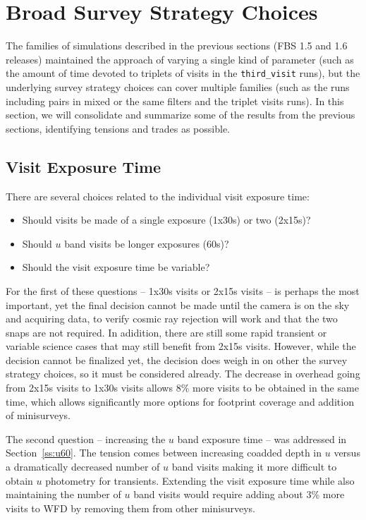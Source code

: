\section{Broad Survey Strategy Choices}

The families of simulations described in the previous sections (FBS 1.5 and 1.6 releases) maintained the approach of varying a single kind of parameter (such as the amount of time devoted to triplets of visits in the {\tt third\_visit} runs), but the underlying survey strategy choices can cover multiple families (such as the runs including pairs in mixed or the same filters and the triplet visits runs). In this section, we will consolidate and summarize some of the results from the previous sections, identifying tensions and trades as possible. 

\subsection{Visit Exposure Time}\label{sec:visitexposuretime}

There are several choices related to the individual visit exposure time:
 \begin{itemize}
 \item Should visits be made of a single exposure (1x30s) or two (2x15s)? 
 \item Should $u$ band visits be longer exposures (60s)?
 \item Should the visit exposure time be variable?
 \end{itemize}
 
For the first of these questions -- 1x30s visits or 2x15s visits -- is perhaps the most important, yet the final decision cannot be made until the camera is on the sky and acquiring data, to verify cosmic ray rejection will work and that the two snaps are not required. In adidition, there are still some rapid transient or variable science cases that may still benefit from 2x15s visits. However, while the decision cannot be finalized yet, the decision does weigh in on other the survey strategy choices, so it must be considered already. The decrease in overhead going from 2x15s visits to 1x30s visits allows 8\% more visits to be obtained in the same time, which allows significantly more options for footprint coverage and addition of minisurveys. 

The second question -- increasing the $u$ band exposure time -- was addressed in Section~\ref{ss:u60}. The tension comes between increasing coadded depth in $u$ versus a dramatically decreased number of $u$ band visits making it more difficult to obtain $u$ photometry for transients. Extending the visit exposure time while also maintaining the number of $u$ band visits would require adding about 3\% more visits to WFD by removing them from other minisurveys. 

